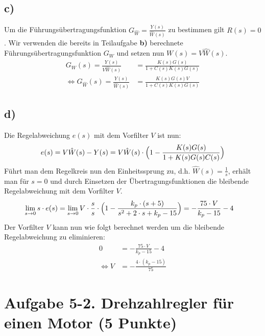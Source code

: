 \documentclass[11pt]{scrartcl} %
\begin{document}
\subsection*{c)}
Um die Führungsübertragungsfunktion $G_{\hat{W}}=\frac{Y(s)}{\hat{W}(s)}$ zu bestimmen gilt $R(s)=0$. Wir verwenden die bereits in Teilaufgabe \textbf{b)} berechnete Führungsübertragungsfunktion $G_W$ und setzen nun $W(s)=V\hat{W}(s)$.
\begin{align*}
	G_{W}(s)=\frac{Y(s)}{V\hat{W}(s)}&=\frac{K(s)G(s)}{1+C(s)K(s)G(s)}\\
	\Leftrightarrow G_{\hat{W}}(s)=\frac{Y(s)}{\hat{W}(s)}&=\frac{K(s)G(s)V}{1+C(s)K(s)G(s)}
\end{align*}
\subsection*{d)}
Die Regelabweichung $e(s)$ mit dem Vorfilter $V$ ist nun:
\begin{align*}
	e(s)=V\hat{W}(s)-Y(s)=V\hat{W}(s)\cdot\Bigl(1-\frac{K(s)G(s)}{1+K(s)G(s)C(s)}\Bigl)
\end{align*}
Führt man dem Regelkreis nun den Einheitssprung zu, d.h. $\hat{W}(s)=\frac{1}{s}$, erhält man für $s=0$ und durch Einsetzen der Übertragungsfunktionen die bleibende Regelabweichung mit dem Vorfilter $V$.
\begin{align*}
	\lim \limits_{s \to 0}s\cdot e(s)&=\lim \limits_{s \to 0}V\cdot\frac{s}{s}\cdot\Bigl(1-\frac{k_p\cdot(s+5)}{s^2+2\cdot s+k_p-15}\Bigr)=-\frac{75\cdot V}{k_p-15}-4
\end{align*}
Der Vorfilter $V$ kann nun wie folgt berechnet werden um die bleibende Regelabweichung zu eliminieren:
\begin{align*}
	0&=-\frac{75\cdot V}{k_p-15}-4\\
\Leftrightarrow V&=-\frac{4\cdot(k_p-15)}{75}
\end{align*}

\section*{Aufgabe 5-2. Drehzahlregler für einen Motor (5 Punkte)}
\end{document}
